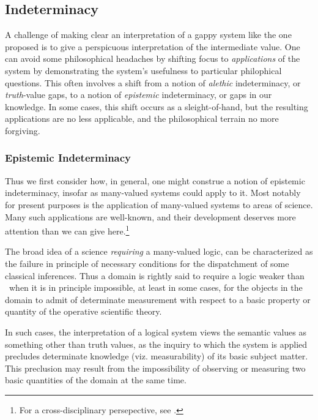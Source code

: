 \subsection{Indeterminacy}\label{indeterminacy}

A challenge of making clear an interpretation of a gappy system like the one proposed is to give a perspicuous interpretation of the intermediate value. One can avoid some philosophical headaches by shifting focus to \emph{applications} of the system by demonstrating the system's usefulness to particular philophical questions. This often involves a shift from a notion of \emph{alethic} indeterminacy, or \emph{truth}-value gaps, to a notion of \emph{epistemic} indeterminacy, or gaps in our knowledge. In some cases, this shift occurs as a sleight-of-hand, but the resulting applications are no less applicable, and the philosophical terrain no more forgiving.

\subsubsection{Epistemic Indeterminacy}\label{epistemicIndeterminacy}

Thus we first consider how, in general, one might construe a notion of epistemic indeterminacy, insofar as many-valued systems could apply to it. Most notably for present purposes is the application of many-valued systems to areas of science. Many such applications are well-known, and their development deserves more attention than we can give here.\footnote{For a cross-disciplinary persepective, see \cite{Weingartner2004}.} 

The broad idea of a science \emph{requiring} a many-valued logic, can be characterized as the failure in principle of necessary conditions for the dispatchment of some classical inferences. Thus a domain is rightly said to require a logic weaker than \CPL\ when it is in principle impossible, at least in some cases, for the objects in the domain to admit of determinate measurement with respect to a basic property or quantity of the operative scientific theory.
	
In such cases, the interpretation of a logical system views the semantic values as something other than truth values, as the inquiry to which the system is applied precludes determinate knowledge (viz. measurability) of its basic subject matter. This preclusion may result from the impossibility of observing or measuring two basic quantities of the domain at the same time.

